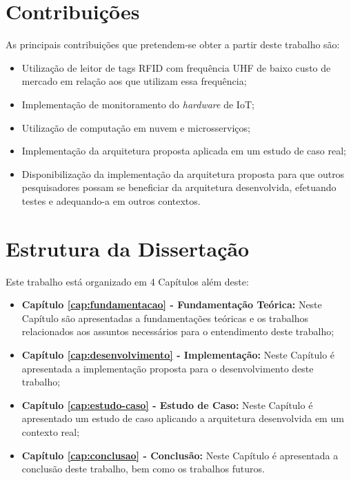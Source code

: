 \section{Contribuições}

As principais contribuições que pretendem-se obter a partir deste trabalho são:

\begin{itemize}
    \item Utilização de leitor de tags \acrshort{RFID} com frequência \acrshort{UHF} de baixo custo de mercado em relação aos que utilizam essa frequência;
    \item Implementação de monitoramento do \textit{hardware} de \acrshort{IoT};
    \item Utilização de computação em nuvem e microsserviços;
    \item Implementação da arquitetura proposta aplicada em um estudo de caso real;
    \item Disponibilização da implementação da arquitetura proposta para que outros pesquisadores possam se beneficiar da arquitetura desenvolvida, efetuando testes e adequando-a em outros contextos.
\end{itemize}

\section{Estrutura da Dissertação}

Este trabalho está organizado em 4 Capítulos além deste: 

\begin{itemize}
    \item \textbf{Capítulo \ref{cap:fundamentacao} - Fundamentação Teórica:} Neste Capítulo são apresentadas a fundamentações teóricas e os trabalhos relacionados aos assuntos necessários para o entendimento deste trabalho;
    \item \textbf{Capítulo \ref{cap:desenvolvimento} - Implementação:} Neste Capítulo é apresentada a implementação proposta para o desenvolvimento deste trabalho;
    \item \textbf{Capítulo \ref{cap:estudo-caso} - Estudo de Caso:} Neste Capítulo é apresentado um estudo de caso aplicando a arquitetura desenvolvida em um contexto real;
    \item \textbf{Capítulo \ref{cap:conclusao} - Conclusão:} Neste Capítulo é apresentada a conclusão deste trabalho, bem como os trabalhos futuros.
\end{itemize}